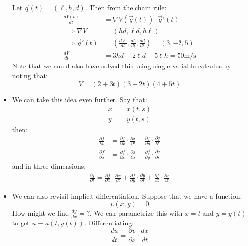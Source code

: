 \begin{itemize}
\begin{example}
        Let $\vec{q}(t) = (\ell, h, d)$. Then from the chain rule:
        \begin{align}
            \frac{dV(t)}{dt} &= \nabla V(\vec{q}(t)) \cdot \vec{q}'(t) \\
            \implies  \nabla V &= (hd, \ell d, h\ell) \\ 
            \implies \vec{q}'(t) &= \left(\frac{d\ell}{dt}, \frac{dh}{dt}, \frac{dd}{dt}\right)=(3,-2,5) \\ 
            \frac{dV}{dt} &= 3hd-2\ell d + 5\ell h = 50\si{\meter\per\second}
        \end{align}
        Note that we could also have solved this using single variable calculus by noting that:
        \begin{equation}
            V = (2+3t)(3-2t)(4+5t)
        \end{equation}
    \end{example}
    \item We can take this idea even further. Say that:
    \begin{align}
        x &= x(t,s) \\ 
        y &= y(t,s)
    \end{align}
    then:
    \begin{align}
        \frac{\partial f}{\partial t} &= \frac{\partial f}{\partial x}\cdot \frac{\partial x}{\partial t} + \frac{\partial f}{\partial y} \cdot \frac{\partial y}{\partial t} \\ 
        \frac{\partial f}{\partial s} &= \frac{\partial f}{\partial x}\cdot \frac{\partial x}{\partial s} + \frac{\partial f}{\partial y}\cdot \frac{\partial y}{\partial s} 
    \end{align}
    and in three dimensions:
    \begin{align}
        \frac{\partial f}{\partial t} = \frac{\partial f}{\partial x}\cdot \frac{\partial x}{\partial t}+\frac{\partial f}{\partial y}\cdot\frac{\partial y}{\partial t} + \frac{\partial f}{\partial z}\cdot \frac{\partial z}{\partial t}
    \end{align}
    \item We can also revisit implicit differentiation. Suppose that we have a function:
    \begin{equation}
        u(x,y) = 0
    \end{equation}
    How might we find $\frac{dy}{dx}=?$. We can parametrize this with $x=t$ and $y=y(t)$ to get $u=u(t,y(t))$. Differentiating:
    \begin{equation}
        \frac{du}{dt} = \frac{\partial u}{\partial x} \cdot \frac{d x}{d t}

\end{equation}
\end{itemize}
